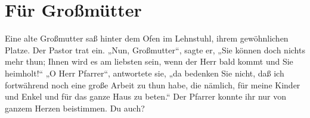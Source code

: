 \chapter{Für Großmütter}

Eine alte Großmutter saß hinter dem Ofen im Lehnstuhl, ihrem gewöhnlichen Platze. Der Pastor trat ein. „Nun, Großmutter“, sagte er, „Sie können doch nichts mehr thun; Ihnen wird es am liebsten sein, wenn der Herr bald kommt und Sie heimholt!“ „O Herr Pfarrer“, antwortete sie, „da bedenken Sie nicht, daß ich fortwährend noch eine große Arbeit zu thun habe, die nämlich, für meine Kinder und Enkel und für das ganze Haus zu beten.“ Der Pfarrer konnte ihr nur von ganzem Herzen beistimmen. Du auch?
